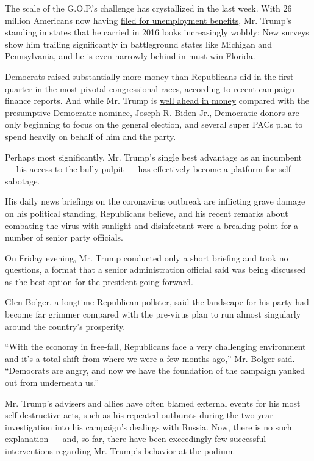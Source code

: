 The scale of the G.O.P.'s challenge has crystallized in the last week.
With 26 million Americans now having
\href{https://www.nytimes3xbfgragh.onion/interactive/2020/04/23/business/coronavirus-unemployment.html}{filed
for unemployment benefits}, Mr. Trump's standing in states that he
carried in 2016 looks increasingly wobbly: New surveys show him trailing
significantly in battleground states like Michigan and Pennsylvania, and
he is even narrowly behind in must-win Florida.

Democrats raised substantially more money than Republicans did in the
first quarter in the most pivotal congressional races, according to
recent campaign finance reports. And while Mr. Trump is
\href{https://www.nytimes3xbfgragh.onion/2020/04/21/us/politics/biden-2020-fundraising.html}{well
ahead in money} compared with the presumptive Democratic nominee, Joseph
R. Biden Jr., Democratic donors are only beginning to focus on the
general election, and several super PACs plan to spend heavily on behalf
of him and the party.

Perhaps most significantly, Mr. Trump's single best advantage as an
incumbent --- his access to the bully pulpit --- has effectively become
a platform for self-sabotage.

His daily news briefings on the coronavirus outbreak are inflicting
grave damage on his political standing, Republicans believe, and his
recent remarks about combating the virus with
\href{https://www.nytimes3xbfgragh.onion/2020/04/24/health/sunlight-coronavirus-trump.html}{sunlight
and disinfectant} were a breaking point for a number of senior party
officials.

On Friday evening, Mr. Trump conducted only a short briefing and took no
questions, a format that a senior administration official said was being
discussed as the best option for the president going forward.

Glen Bolger, a longtime Republican pollster, said the landscape for his
party had become far grimmer compared with the pre-virus plan to run
almost singularly around the country's prosperity.

``With the economy in free-fall, Republicans face a very challenging
environment and it's a total shift from where we were a few months
ago,'' Mr. Bolger said. ``Democrats are angry, and now we have the
foundation of the campaign yanked out from underneath us.''

Mr. Trump's advisers and allies have often blamed external events for
his most self-destructive acts, such as his repeated outbursts during
the two-year investigation into his campaign's dealings with Russia.
Now, there is no such explanation --- and, so far, there have been
exceedingly few successful interventions regarding Mr. Trump's behavior
at the podium.

